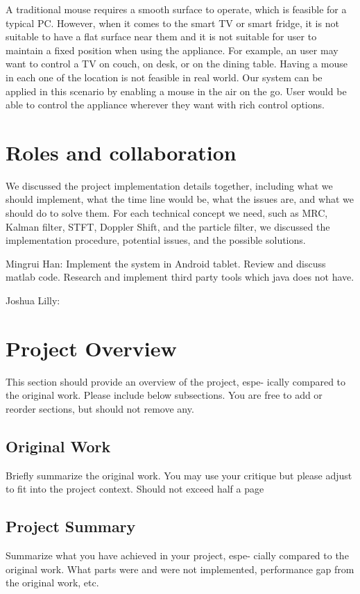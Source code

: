 \documentclass{acm_proc_article-sp}
\begin{document}
A traditional mouse requires a smooth surface to operate, which is 
feasible for a typical PC. However, when it comes to the smart TV
or smart fridge, it is not suitable to have a flat surface near them
and it is not suitable for user to maintain a fixed position when
using the appliance. For example, an user may want to control a TV 
on couch, on desk, or on the dining table. Having a mouse in each
one of the location is not feasible in real world. Our system can be
applied in this scenario by enabling a mouse in the air on the go.
User would be able to control the appliance wherever they want with
rich control options.

\section{Roles and collaboration} \label{roles and collaboration}
We discussed the project implementation details together, including
what we should implement, what the time line would be, what the issues
are, and what we should do to solve them. For each technical concept
we need, such as MRC, Kalman filter, STFT, Doppler Shift, and the
particle filter, we discussed the implementation procedure, 
potential issues, and the possible solutions.

Mingrui Han: Implement the system in Android tablet. Review and discuss matlab code. 
Research and implement third party tools which java does
not have.  

Joshua Lilly:

\section{Project Overview} \label{project_overview}
This section should provide an overview of the project, espe-
ically compared to the original work.  Please include below
subsections.   You  are  free  to  add  or  reorder  sections,  but
should not remove any.

\subsection{Original Work}
Briefly  summarize  the  original  work.   You  may  use  your
critique  but  please  adjust  to  fit  into  the  project  context.
Should not exceed half a page

\subsection{Project Summary}
Summarize  what  you  have  achieved  in  your  project,  espe-
cially compared to the original work.  What parts were and
were  not  implemented,  performance  gap  from  the  original
work, etc.
\end{document}
